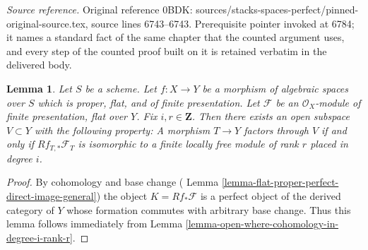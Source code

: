\documentclass[10pt,a4paper]{amsart}
\theoremstyle{plain}
\newtheorem{lemma}[subsection]{Lemma}
\theoremstyle{definition}
\theoremstyle{remark}
\numberwithin{equation}{subsection}
\begin{document}
\noindent\textit{Source reference.} Original reference 0BDK: sources/stacks-spaces-perfect/pinned-original-source.tex, source lines 6743--6743. Prerequisite pointer invoked at 6784; it names a standard fact of the same chapter that the counted argument uses, and every step of the counted proof built on it is retained verbatim in the delivered body.\par\medskip
\begin{lemma}
\label{lemma-open-where-cohomology-in-degree-i-rank-r-geometric}
Let $S$ be a scheme.
Let $f : X \to Y$ be a morphism of algebraic spaces over $S$
which is proper, flat, and of finite presentation.
Let $\mathcal{F}$ be an $\mathcal{O}_X$-module of finite presentation,
flat over $Y$. Fix $i, r \in \mathbf{Z}$.
Then there exists an open subspace
$V \subset Y$ with the following property:
A morphism $T \to Y$ factors through $V$ if and only if
$Rf_{T, *}\mathcal{F}_T$ is isomorphic to a
finite locally free module of rank $r$ placed in degree $i$.
\end{lemma}

\begin{proof}
By cohomology and base change (
Lemma \ref{lemma-flat-proper-perfect-direct-image-general})
the object $K = Rf_*\mathcal{F}$ is a perfect object of the derived
category of $Y$ whose formation commutes with arbitrary base change.
Thus this lemma follows immediately from
Lemma \ref{lemma-open-where-cohomology-in-degree-i-rank-r}.
\end{proof}
\end{document}
